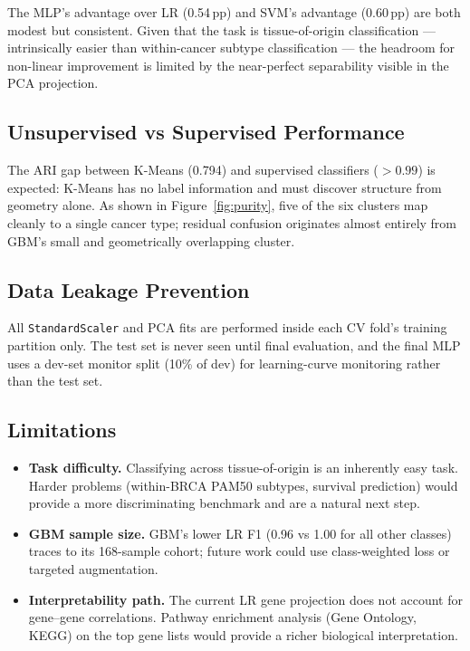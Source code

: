 \documentclass[11pt,letterpaper]{article}
\begin{document}
The MLP's advantage over LR (0.54\,pp) and SVM's advantage (0.60\,pp) are
both modest but consistent.  Given that the task is tissue-of-origin
classification --- intrinsically easier than within-cancer subtype
classification --- the headroom for non-linear improvement is limited by the
near-perfect separability visible in the PCA projection.

\subsection{Unsupervised vs Supervised Performance}

The ARI gap between K-Means (0.794) and supervised classifiers ($>0.99$) is
expected: K-Means has no label information and must discover structure from
geometry alone.  As shown in Figure~\ref{fig:purity}, five of the six clusters
map cleanly to a single cancer type; residual confusion originates almost
entirely from GBM's small and geometrically overlapping cluster.

\subsection{Data Leakage Prevention}

All \texttt{StandardScaler} and PCA fits are performed inside each CV fold's
training partition only.  The test set is never seen until final evaluation,
and the final MLP uses a dev-set monitor split (10\% of dev) for learning-curve
monitoring rather than the test set.

\subsection{Limitations}

\begin{itemize}[leftmargin=2em,itemsep=1pt]
  \item \textbf{Task difficulty.}  Classifying across tissue-of-origin is an
        inherently easy task.  Harder problems (within-BRCA PAM50 subtypes,
        survival prediction) would provide a more discriminating benchmark and
        are a natural next step.
  \item \textbf{GBM sample size.}  GBM's lower LR F1 (0.96 vs 1.00 for all
        other classes) traces to its 168-sample cohort; future work could use
        class-weighted loss or targeted augmentation.
  \item \textbf{Interpretability path.}  The current LR gene projection does
        not account for gene--gene correlations.  Pathway enrichment analysis
        (Gene Ontology, KEGG) on the top gene lists would provide a richer
        biological interpretation.
\end{itemize}
\end{document}
